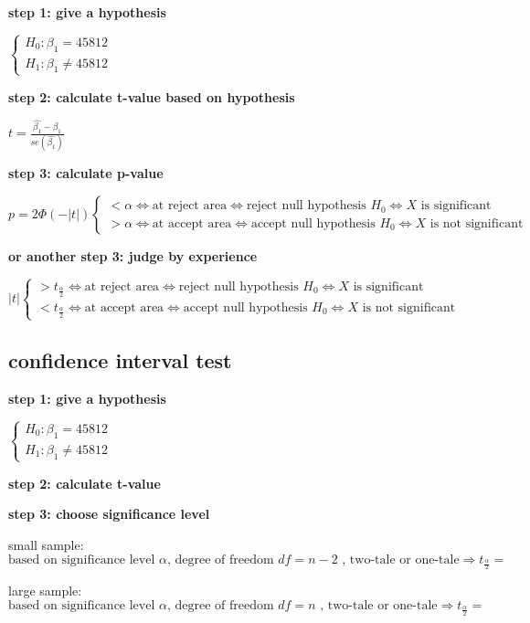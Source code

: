 \documentclass{article}
\begin{document}
\textbf{step 1: give a hypothesis}

$\begin{cases}
  H_0: \beta_1  = 45812
  \\
  H_1: \beta_1 \neq 45812
\end{cases}$


\textbf{step 2: calculate t-value based on hypothesis}

$t=\frac{\hat{\beta_{1}}-\beta_{1}}{se(\hat{\beta_{1}})}$

\textbf{step 3:  calculate p-value}

$p=2 \Phi(-|t|) 
\begin{cases}
  < \alpha \iff \text{at reject area} \iff \text{reject null hypothesis $H_0$} \iff \text{$X$ is significant}
  \\
  > \alpha \iff \text{at accept area} \iff \text{accept null hypothesis $H_0$} \iff \text{$X$ is not significant}
\end{cases}$

\textbf{or another step 3:  judge by experience}

$|t|
\begin{cases}
>t_{\frac{\alpha}{2}} \iff \text{at reject area} \iff \text{reject null hypothesis $H_0$} \iff \text{$X$ is significant}
\\
<t_{\frac{\alpha}{2}} \iff \text{at accept area} \iff \text{accept null hypothesis $H_0$} \iff \text{$X$ is not significant}
\end{cases}$


\subsection{confidence interval test} %
\label{subp:confidence_interval_test}

\textbf{step 1: give a hypothesis}

$\begin{cases}
  H_0: \beta_1  = 45812
  \\
  H_1: \beta_1 \neq 45812
\end{cases}$

\textbf{step 2: calculate t-value}

\textbf{step 3: choose significance level}

small sample: $\text{based on significance level $\alpha$, degree of freedom $df=n-2$ , two-tale or one-tale} \Rightarrow t_{\frac{\alpha}{2}}=$

large sample: $\text{based on significance level $\alpha$, degree of freedom $df=n$ , two-tale or one-tale} \Rightarrow t_{\frac{\alpha}{2}}=$
\end{document}
